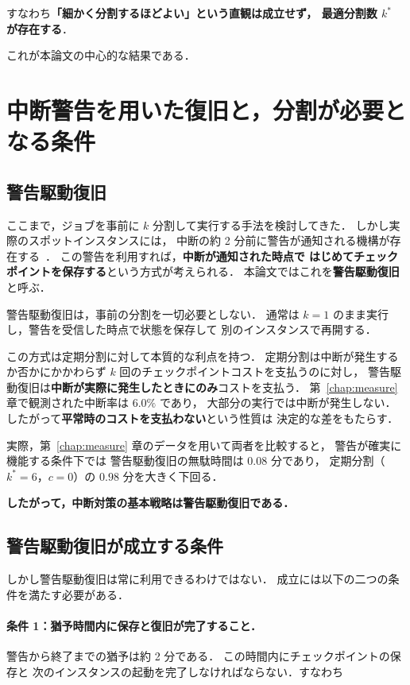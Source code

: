 \documentclass[11pt,a4paper]{ltjsreport}
\begin{document}
すなわち\textbf{「細かく分割するほどよい」という直観は成立せず，
最適分割数 $k^{*}$ が存在する}．

これが本論文の中心的な結果である．

\section{中断警告を用いた復旧と，分割が必要となる条件}
\label{sec:warning}

\subsection{警告駆動復旧}

ここまで，ジョブを事前に $k$ 分割して実行する手法を検討してきた．
しかし実際のスポットインスタンスには，
中断の約 2 分前に警告が通知される機構が存在する~\cite{AWSSpot}．
この警告を利用すれば，\textbf{中断が通知された時点で
はじめてチェックポイントを保存する}という方式が考えられる．
本論文ではこれを\textbf{警告駆動復旧}と呼ぶ．

警告駆動復旧は，事前の分割を一切必要としない．
通常は $k = 1$ のまま実行し，警告を受信した時点で状態を保存して
別のインスタンスで再開する．

この方式は定期分割に対して本質的な利点を持つ．
定期分割は中断が発生するか否かにかかわらず
$k$ 回のチェックポイントコストを支払うのに対し，
警告駆動復旧は\textbf{中断が実際に発生したときにのみ}コストを支払う．
第~\ref{chap:measure} 章で観測された中断率は $6.0\%$ であり，
大部分の実行では中断が発生しない．
したがって\textbf{平常時のコストを支払わない}という性質は
決定的な差をもたらす．

実際，第~\ref{chap:measure} 章のデータを用いて両者を比較すると，
警告が確実に機能する条件下では
警告駆動復旧の無駄時間は $0.08$ 分であり，
定期分割（$k^{*}=6$，$c=0$）の $0.98$ 分を大きく下回る．

\textbf{したがって，中断対策の基本戦略は警告駆動復旧である．}

\subsection{警告駆動復旧が成立する条件}
\label{sec:warning_cond}

しかし警告駆動復旧は常に利用できるわけではない．
成立には以下の二つの条件を満たす必要がある．

\paragraph{条件 1：猶予時間内に保存と復旧が完了すること．}
警告から終了までの猶予は約 2 分である．
この時間内にチェックポイントの保存と
次のインスタンスの起動を完了しなければならない．すなわち
\end{document}
